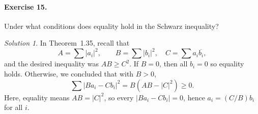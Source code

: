\documentclass[11pt]{report}
\theoremstyle{remark}
\newtheorem*{solution}{Solution}
\begin{document}
    \paragraph{Exercise 15.} Under what conditions does equality hold in the Schwarz
    inequality?
    \begin{solution}
        In Theorem~1.35, recall that \[
            A = \sum |a_i|^2, \qquad B = \sum |b_i|^2, \quad C = \sum a_i
            \overline{b_i},   
        \] and the desired inequality was $AB \geq C^2$.
        If $B = 0$, then all $b_i = 0$ so equality holds. Otherwise, we concluded
        that with $B > 0$, \[
            \sum |Ba_i - Cb_i|^2 = B(AB - |C|^2) \geq 0.
        \] Here, equality means $AB = |C|^2$, so every $|Ba_i - Cb_i| = 0$, hence
        $a_i = (C / B)b_i$ for all $i$.
    \end{solution}
    
\end{document}
